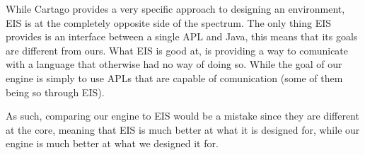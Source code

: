 While Cartago provides a very specific approach to designing an environment,
EIS is at the completely opposite side of the spectrum. The only thing
EIS provides is an interface between a single APL and Java, this means
that its goals are different from ours. What EIS is good at, is providing
a way to comunicate with a language that otherwise had no way of doing
so. While the goal of our engine is simply to use APLs that are capable
of comunication (some of them being so through EIS).

As such, comparing our engine to EIS would be a mistake since they
are different at the core, meaning that EIS is much better at what
it is designed for, while our engine is much better at what we designed
it for.
